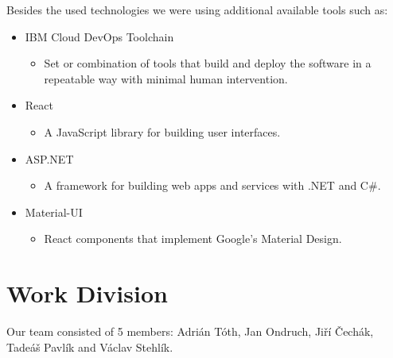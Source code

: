 \documentclass[11pt,a4paper]{article}
\begin{document}
Besides the used technologies we were using additional available tools such as:
\begin{itemize}
    \item IBM Cloud DevOps Toolchain
    \begin{itemize}
        \item Set or combination of tools that build and deploy the software in a repeatable way with minimal human intervention.
    \end{itemize}

    \item React
    \begin{itemize}
        \item A JavaScript library for building user interfaces.
    \end{itemize}

    \item ASP.NET
    \begin{itemize}
        \item A framework for building web apps and services with .NET and C\#.
    \end{itemize}

    \item Material-UI
    \begin{itemize}
        \item React components that implement Google's Material Design.
    \end{itemize}
\end{itemize}

\section{Work Division}

Our team consisted of 5 members: Adrián Tóth, Jan Ondruch, Jiří Čechák, Tadeáš Pavlík and Václav Stehlík.\\
\end{document}
